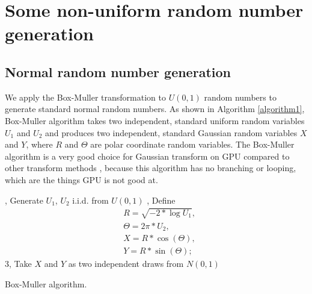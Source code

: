\documentclass[article,nojss]{jss}\usepackage[]{graphicx}\usepackage[]{color}
\begin{document}







\section{Some non-uniform random number generation}
\subsection{Normal random number generation}
We apply the Box-Muller transformation to $U(0,1)$ random numbers to generate standard normal random numbers. As shown in Algorithm \ref{algorithm1}, Box-Muller algorithm takes two independent, standard uniform random variables $U_1$ and $U_2$ and produces two independent, standard Gaussian random variables $X$ and $Y$, where $R$ and $\Theta$ are polar coordinate random variables. %
The Box-Muller algorithm is a very good choice for Gaussian transform on GPU compared to other transform methods \citep{howes2007efficient}, because this algorithm has no branching or looping, which are the things GPU is not good at. %

\begin{algorithm*}[H] \label{algorithm1}
, Generate $U_1$, $U_2$ i.i.d. from $U (0,1)$ , Define \begin{align*} 
& R = \sqrt{-2*\log U_1},\\
&  \Theta = 2\pi*U_2,\\
&  X=R*\cos(\Theta),\\
& Y=R*\sin(\Theta);\;\end{align*}
 3, Take $X$ and $Y$ as two independent draws from $N(0,1)$\;
 \caption{Box-Muller algorithm.}
\end{algorithm*}
\end{document}
